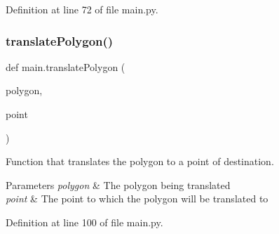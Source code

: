 Definition at line 72 of file main.\+py.

\mbox{\label{namespacemain_adeb2cd76f03836777dd43cb9bc133d89}} 
\subsubsection{\texorpdfstring{translate\+Polygon()}{translatePolygon()}}
{\footnotesize\ttfamily def main.\+translate\+Polygon (\begin{DoxyParamCaption}\item[{}]{polygon,  }\item[{}]{point }\end{DoxyParamCaption})}



Function that translates the polygon to a point of destination. 


\begin{DoxyParams}{Parameters}
{\em polygon} & The polygon being translated \\
\hline
{\em point} & The point to which the polygon will be translated to \\
\hline
\end{DoxyParams}


Definition at line 100 of file main.\+py.


